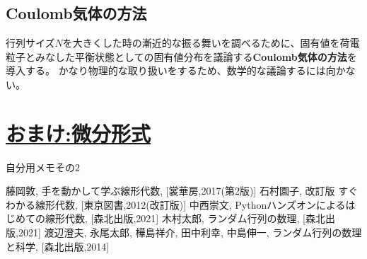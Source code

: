 \documentclass[10pt]{jsreport}
\theoremstyle{definition}%
\numberwithin{equation}{section}%
\begin{document}
\section{Coulomb気体の方法}
行列サイズ$N$を大きくした時の漸近的な振る舞いを調べるために、固有値を荷電粒子とみなした平衡状態としての固有値分布を議論する{\bf Coulomb気体の方法}を導入する。
かなり物理的な取り扱いをするため、数学的な議論するには向かない。

\chapter{\underline{おまけ:微分形式}}
自分用メモその2
\begin{thebibliography}{99}
   藤岡敦, 手を動かして学ぶ線形代数, [裳華房,2017(第2版)]
   石村園子, 改訂版 すぐわかる線形代数, [東京図書,2012(改訂版)]
   中西崇文, Pythonハンズオンによるはじめての線形代数, [森北出版,2021]
   木村太郎, ランダム行列の数理, [森北出版,2021]
   渡辺澄夫, 永尾太郎, 樺島祥介, 田中利幸, 中島伸一, ランダム行列の数理と科学, [森北出版,2014]
\end{thebibliography}
\end{document}
